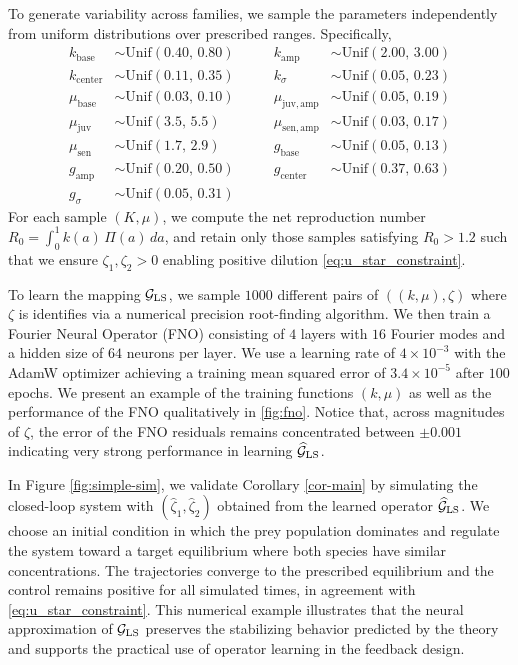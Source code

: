\documentclass[journal,twoside,web]{ieeecolor}
\begin{document}
To generate variability across families, we sample the parameters independently from uniform distributions over prescribed ranges. Specifically,
\begin{align*}
k_{\mathrm{base}}   &\sim \mathrm{Unif}(0.40,\,0.80) &\qquad
k_{\mathrm{amp}}    &\sim \mathrm{Unif}(2.00,\,3.00) \\
k_{\mathrm{center}} &\sim \mathrm{Unif}(0.11,\,0.35) &\qquad
k_{\sigma}          &\sim \mathrm{Unif}(0.05,\,0.23) \\
\mu_{\mathrm{base}}          &\sim \mathrm{Unif}(0.03,\,0.10) &\qquad
\mu_{\mathrm{juv, amp}}  &\sim \mathrm{Unif}(0.05,\,0.19) \\
\mu_{\mathrm{juv}}&\sim \mathrm{Unif}(3.5,\,5.5)   &\qquad
\mu_{\mathrm{sen, amp}}  &\sim \mathrm{Unif}(0.03,\,0.17) \\
\mu_{\mathrm{sen}}&\sim \mathrm{Unif}(1.7,\,2.9)   &\qquad
g_{\mathrm{base}} &\sim \mathrm{Unif}(0.05,\,0.13) \\
g_{\mathrm{amp}}    &\sim \mathrm{Unif}(0.20,\,0.50) &\qquad
g_{\mathrm{center}} &\sim \mathrm{Unif}(0.37,\,0.63) \\
g_{\sigma}          &\sim \mathrm{Unif}(0.05,\,0.31) &
\end{align*}
For each sample \((K,\mu)\), we compute the net reproduction number $R_0=\int_0^1 k(a)\,\Pi(a)\,da$, 
and retain only those samples satisfying $R_0 > 1.2$ such that we ensure $\zeta_1, \zeta_2 > 0$ enabling positive dilution \eqref{eq:u_star_constraint}. 

To learn the mapping $\mathcal{G}_{\rm LS}$, we sample $1000$ different pairs of $((k, \mu), \zeta)$ where $\zeta$ is identifies via a numerical precision root-finding algorithm. We then train a Fourier Neural Operator (FNO) \cite{li2021Fourier} consisting of $4$ layers with $16$ Fourier modes and a hidden size of $64$ neurons per layer. We use a learning rate of $4 \times 10^{-3}$ with the AdamW optimizer \cite{loshchilov2018decoupled} achieving a training mean squared error of $3.4 \times 10^{-5}$ after $100$ epochs. We present an example of the training functions $(k, \mu)$ as well as the performance of the FNO qualitatively in \ref{fig:fno}. Notice that, across magnitudes of $\zeta$, the error of the FNO residuals remains concentrated between $\pm 0.001$ indicating very strong performance in learning $\widehat{\mathcal{G}}_{\rm LS}$. 

In Figure \ref{fig:simple-sim}, we validate Corollary \ref{cor-main} by simulating the closed-loop system with $(\hat{\zeta}_1,\hat{\zeta}_2)$ obtained from the learned operator $\widehat{\mathcal{G}}_{\rm LS}$. We choose an initial condition in which the prey population dominates and regulate the system toward a target equilibrium where both species have similar concentrations. The trajectories converge to the prescribed equilibrium and the control remains positive for all simulated times, in agreement with \eqref{eq:u_star_constraint}. This numerical example illustrates that the neural approximation of $\mathcal{G}_{\rm LS}$ preserves the stabilizing behavior predicted by the theory and supports the practical use of operator learning in the feedback design.
\end{document}
